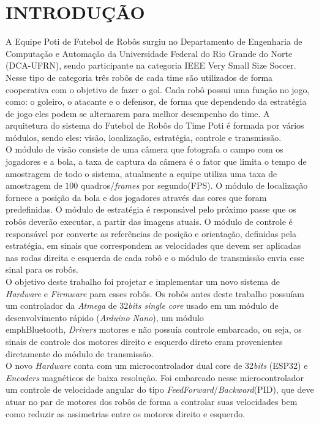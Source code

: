 \section{INTRODUÇÃO}

A Equipe Poti de Futebol de Robôs surgiu no Departamento de Engenharia de Computação e Automação da Universidade Federal do Rio Grande do Norte (DCA-UFRN), sendo participante na categoria IEEE Very Small Size Soccer.
\\
Nesse tipo de categoria três robôs de cada time são utilizados de forma cooperativa com o objetivo de fazer o gol. Cada robô possui uma função no jogo, como: o goleiro, o atacante e o defensor, de forma que dependendo da estratégia de jogo eles podem se alternarem para melhor desempenho do time. A arquitetura do sistema do Futebol de Robôs do Time Poti é formada por vários módulos, sendo eles: visão, localização, estratégia, controle e transmissão.\\

O módulo de visão consiste de uma câmera que fotografa o campo com os jogadores e a bola, a taxa de captura da câmera é o fator que limita o tempo de amostragem de todo o sistema, atualmente a equipe utiliza uma taxa de amostragem de $100$ quadros/\emph{frames} por segundo(FPS). O módulo de localização fornece a posição da bola e dos jogadores através das cores que foram predefinidas. O módulo de estratégia é responsável pelo próximo passe que os robôs deverão executar, a partir das imagens atuais. O módulo de controle é responsável por converte as referências de posição e orientação, definidas pela estratégia, em sinais que correspondem as velocidades que devem ser aplicadas nas rodas direita e esquerda de cada robô e o módulo de transmissão envia esse sinal para os robôs.\\

O objetivo deste trabalho foi projetar e implementar um novo sistema de \textit{Hardware} e \textit{Firmware} para esses robôs. Os robôs antes deste trabalho possuíam um controlador da \emph{Atmega} de 32\emph{bits single core} usado em um módulo de desenvolvimento rápido (\emph{Arduino Nano}), um módulo \\emph{Bluetooth}, \emph{Drivers} motores e não possuía controle embarcado, ou seja, os sinais de controle dos motores direito e esquerdo direto eram provenientes diretamente do módulo de transmissão.\\

O novo \textit{Hardware}  conta com um microcontrolador dual core de 32\emph{bits} (ESP32) e \textit{Encoders} magnéticos de baixa resolução. Foi embarcado  nesse microcontrolador um controle de velocidade angular do tipo  \textit{FeedForward}/\textit{Backward}(PID), que deve atuar no par de motores dos robôs de  forma a controlar suas velocidades bem como reduzir as assimetrias entre  os motores direito e esquerdo.\\

